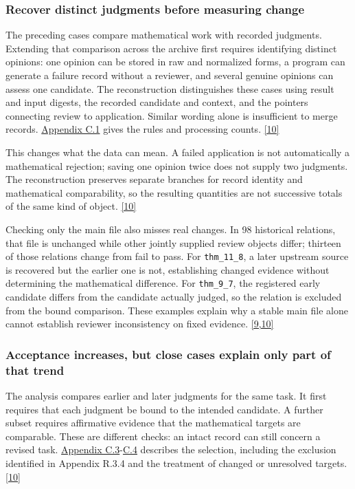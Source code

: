\subsubsection[Recover distinct judgments before measuring change]{\texorpdfstring{\protect\hypertarget{r3-4}{}Recover distinct judgments before measuring change}{Recover distinct judgments before measuring change}}
The preceding cases compare mathematical work with recorded judgments. Extending that comparison across the archive first requires identifying distinct opinions: one opinion can be stored in raw and normalized forms, a program can generate a failure record without a reviewer, and several genuine opinions can assess one candidate. The reconstruction distinguishes these cases using result and input digests, the recorded candidate and context, and the pointers connecting review to application. Similar wording alone is insufficient to merge records. \href{en-appendix.pdf\#c1}{Appendix C.1} gives the rules and processing counts. \href{en.pdf\#ref-10}{\mbox{[10]}}

This changes what the data can mean. A failed application is not automatically a mathematical rejection; saving one opinion twice does not supply two judgments. The reconstruction preserves separate branches for record identity and mathematical comparability, so the resulting quantities are not successive totals of the same kind of object. \href{en.pdf\#ref-10}{\mbox{[10]}}

Checking only the main file also misses real changes. In 98 historical relations, that file is unchanged while other jointly supplied review objects differ; thirteen of those relations change from fail to pass. For \nolinkurl{thm_11_8}, a later upstream source is recovered but the earlier one is not, establishing changed evidence without determining the mathematical difference. For \nolinkurl{thm_9_7}, the registered early candidate differs from the candidate actually judged, so the relation is excluded from the bound comparison. These examples explain why a stable main file alone cannot establish reviewer inconsistency on fixed evidence. \href{en.pdf\#ref-9}{\mbox{[9,10]}}

\subsubsection[Acceptance increases, but close cases explain only part of that trend]{\texorpdfstring{\protect\hypertarget{r3-5}{}Acceptance increases, but close cases explain only part of that trend}{Acceptance increases, but close cases explain only part of that trend}}
The analysis compares earlier and later judgments for the same task. It first requires that each judgment be bound to the intended candidate. A further subset requires affirmative evidence that the mathematical targets are comparable. These are different checks: an intact record can still concern a revised task. \href{en-appendix.pdf\#c3}{Appendix C.3}-\href{en-appendix.pdf\#c4}{C.4} describes the selection, including the exclusion identified in Appendix R.3.4 and the treatment of changed or unresolved targets. \href{en.pdf\#ref-10}{\mbox{[10]}}

